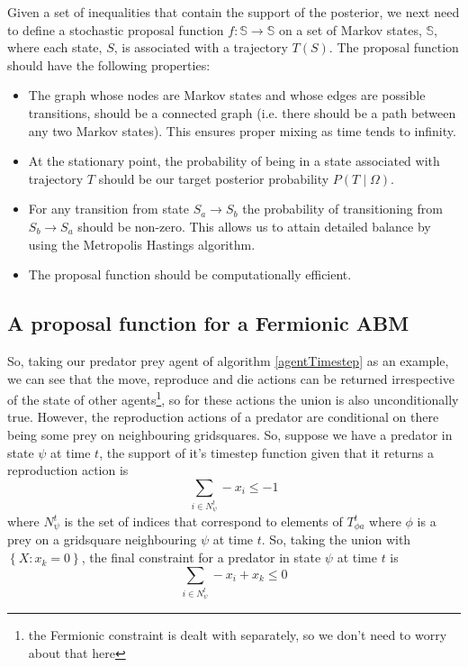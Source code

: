 \documentclass{article}
\begin{document}
Given a set of inequalities that contain the support of the posterior, we next need to define a stochastic proposal function $f:\mathbb{S} \to \mathbb{S}$ on a set of Markov states, $\mathbb{S}$, where each state, $S$, is associated with a trajectory $T(S)$. The proposal function should have the following properties:
\begin{itemize}
	\item The graph whose nodes are Markov states and whose edges are possible transitions, should be a connected graph (i.e. there should be a path between any two Markov states). This ensures proper mixing as time tends to infinity.
	
	\item At the stationary point, the probability of being in a state associated with trajectory $T$ should be our target posterior probability $P(T \mid \Omega)$.
	
	\item For any transition from state $S_a \to S_b$ the probability of transitioning from $S_b \to S_a$ should be non-zero. This allows us to attain detailed balance by using the Metropolis Hastings algorithm.
	
	\item The proposal function should be computationally efficient. 
\end{itemize}

\subsection{A proposal function for a Fermionic ABM}
\label{Fermionic}


So, taking our predator prey agent of algorithm \ref{agentTimestep} as an example, we can see that the move, reproduce and die actions can be returned irrespective of the state of other agents\footnote{the Fermionic constraint is dealt with separately, so we don't need to worry about that here}, so for these actions the union is also unconditionally true. However, the reproduction actions of a predator are conditional on there being some prey on neighbouring gridsquares. So, suppose we have a predator in state $\psi$ at time $t$, the support of it's timestep function given that it returns a reproduction action is
\[
\sum_{i \in N^t_\psi} -x_i \le -1
\]
where $N^t_\psi$ is the set of indices that correspond to elements of $T^t_{\phi a}$ where $\phi$ is a prey on a gridsquare neighbouring $\psi$ at time $t$. So, taking the union with $\left\{X: x_k = 0\right\}$, the final constraint for a predator in state $\psi$ at time $t$ is
\[
\sum_{i \in N^t_\psi} -x_i  + x_k  \le 0
\]
\end{document}
